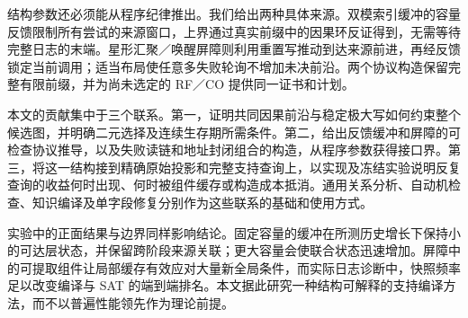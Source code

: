 结构参数还必须能从程序纪律推出。我们给出两种具体来源。双模索引缓冲的容量反馈限制所有尝试的来源窗口，上界通过真实前缀中的因果环反证得到，无需等待完整日志的末端。星形汇聚／唤醒屏障则利用重置写推动到达来源前进，再经反馈锁定当前调用；适当布局使任意多失败轮询不增加未决前沿。两个协议构造保留完整有限前缀，并为尚未选定的 RF／CO 提供同一证书和计划。

本文的贡献集中于三个联系。第一，证明共同因果前沿与稳定极大写如何约束整个候选图，并明确二元选择及连续生存期所需条件。第二，给出反馈缓冲和屏障的可检查协议推导，以及失败读链和地址封闭组合的构造，从程序参数获得接口界。第三，将这一结构接到精确原始投影和完整支持查询上，以实现及冻结实验说明反复查询的收益何时出现、何时被组件缓存或构造成本抵消。通用关系分析、自动机检查、知识编译及单字段修复分别作为这些联系的基础和使用方式。

实验中的正面结果与边界同样影响结论。固定容量的缓冲在所测历史增长下保持小的可达层状态，并保留跨阶段来源关联；更大容量会使联合状态迅速增加。屏障中的可提取组件让局部缓存有效应对大量新全局条件，而实际日志诊断中，快照频率足以改变编译与 SAT 的端到端排名。本文据此研究一种结构可解释的支持编译方法，而不以普遍性能领先作为理论前提。

